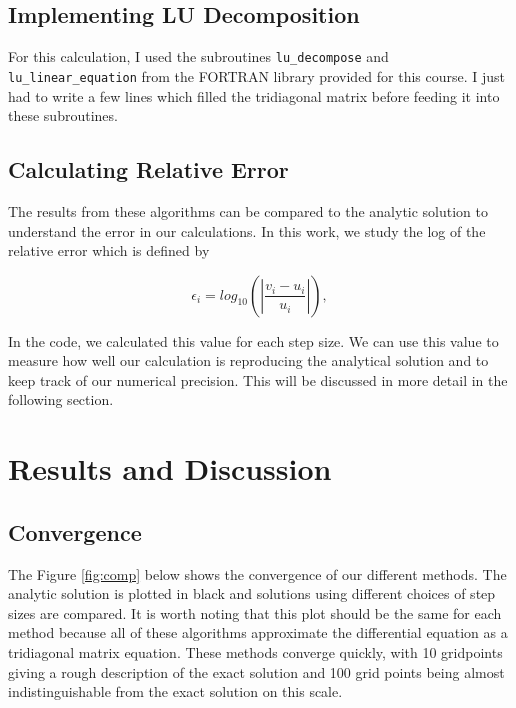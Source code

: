 \documentclass[%
oneside,                 %
final,                   %
10pt]{article}
\begin{document}
\subsection{Implementing LU Decomposition}

For this calculation, I used the subroutines \texttt{lu\_decompose} and \texttt{lu\_linear\_equation} from the FORTRAN library provided for this course.  I just had to write a few lines which filled the tridiagonal matrix before feeding it into these subroutines.

\subsection{Calculating Relative Error}

The results from these algorithms can be compared to the analytic solution to understand the error in our calculations.  In this work, we study the log of the relative error which is defined by

\[
   \epsilon_i=log_{10}\left(\left|\frac{v_i-u_i}
                 {u_i}\right|\right),
\]

In the code, we calculated this value for each step size.  We can use this value to measure how well our calculation is reproducing the analytical solution and to keep track of our numerical precision.  This will be discussed in more detail in the following section.

\section{Results and Discussion}

\subsection{Convergence}

The Figure \ref{fig:comp} below shows the convergence of our different methods.  The analytic solution is plotted in black and solutions using different choices of step sizes are compared.  It is worth noting that this plot should be the same for each method because all of these algorithms approximate the differential equation as a tridiagonal matrix equation.  These methods converge quickly, with 10 gridpoints giving a rough description of the exact solution and 100 grid points being almost indistinguishable from the exact solution on this scale.
\end{document}
